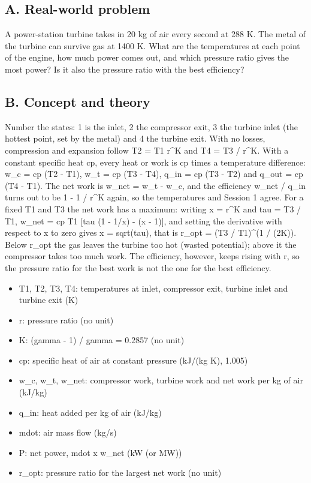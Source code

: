 \documentclass[11pt,a4paper]{article}
\begin{document}
\subsection*{A. Real-world problem}
A power-station turbine takes in 20 kg of air every second at 288 K. The metal of the turbine can survive gas at 1400 K. What are the temperatures at each point of the engine, how much power comes out, and which pressure ratio gives the most power? Is it also the pressure ratio with the best efficiency?

\subsection*{B. Concept and theory}
Number the states: 1 is the inlet, 2 the compressor exit, 3 the turbine inlet (the hottest point, set by the metal) and 4 the turbine exit. With no losses, compression and expansion follow T2 = T1 r\textasciicircum{}K and T4 = T3 / r\textasciicircum{}K. With a constant specific heat cp, every heat or work is cp times a temperature difference: w\_c = cp (T2 - T1), w\_t = cp (T3 - T4), q\_in = cp (T3 - T2) and q\_out = cp (T4 - T1). The net work is w\_net = w\_t - w\_c, and the efficiency w\_net / q\_in turns out to be 1 - 1 / r\textasciicircum{}K again, so the temperatures and Session 1 agree. For a fixed T1 and T3 the net work has a maximum: writing x = r\textasciicircum{}K and tau = T3 / T1, w\_net = cp T1 [tau (1 - 1/x) - (x - 1)], and setting the derivative with respect to x to zero gives x = sqrt(tau), that is r\_opt = (T3 / T1)\textasciicircum{}(1 / (2K)). Below r\_opt the gas leaves the turbine too hot (wasted potential); above it the compressor takes too much work. The efficiency, however, keeps rising with r, so the pressure ratio for the best work is not the one for the best efficiency.

\begin{itemize}[nosep]
\item T1, T2, T3, T4: temperatures at inlet, compressor exit, turbine inlet and turbine exit (K)
\item r: pressure ratio (no unit)
\item K: (gamma - 1) / gamma = 0.2857 (no unit)
\item cp: specific heat of air at constant pressure (kJ/(kg K), 1.005)
\item w\_c, w\_t, w\_net: compressor work, turbine work and net work per kg of air (kJ/kg)
\item q\_in: heat added per kg of air (kJ/kg)
\item mdot: air mass flow (kg/s)
\item P: net power, mdot x w\_net (kW (or MW))
\item r\_opt: pressure ratio for the largest net work (no unit)
\end{itemize}
\end{document}
